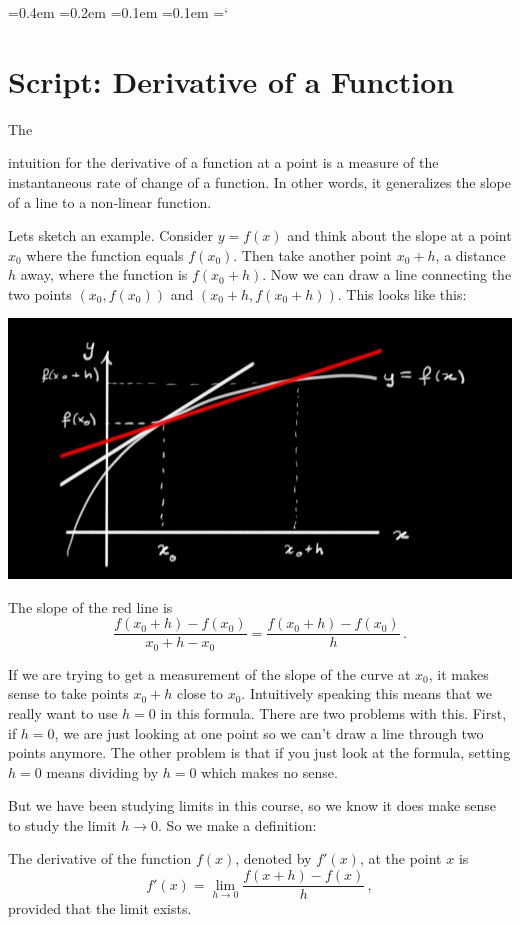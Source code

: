 {\ttfamily
{}\font=0.4em
\font=0.2em
\font=0.1em
\font=0.1em
\hyphenchar\font=`\-



\section*{Script: Derivative of a Function}

\thispagestyle{empty}


\hypertarget{The Derivative}{The} intuition for the derivative of a function at a point is  
a measure of the instantaneous rate of change of a function. In other words, it generalizes
the slope of a line to a non-linear function. 

Lets sketch an example. Consider $y=f(x)$ and think about the slope at a point $x_0$ where the function
equals $f(x_0)$. Then take another point $x_0+h$, a distance $h$ away, where the function is $f(x_0+h)$.
Now we can draw a line connecting the two points $(x_0,f(x_0))$ and $(x_0+h,f(x_0+h))$. This looks like this:

\begin{center}
\includegraphics[scale=.4]{slope_red.jpg}
\end{center} 
 
\noindent 
The slope of the red line is
\[
\frac{f(x_0+h)-f(x_0)}{x_0+h-x_0}=\frac{f(x_0+h)-f(x_0)}{h}\, .
\] 

If we are trying to get a measurement of the slope of the curve at $x_0$, it makes sense to take points $x_0+h$
close to $x_0$. Intuitively speaking this means that we really want to use $h=0$ in this formula. There are two problems 
with this. First, if $h=0$, we are just looking at one point so we can't draw a line through two points anymore. The other problem
is that if you just look at the formula, setting $h=0$ means dividing by $h=0$ which makes no sense.


\newpage
\thispagestyle{empty}

But we have been studying limits in this course, so we know it does make sense to study the limit $h\to 0$. So we make a definition:
}
\begin{definition}
The derivative of the function $f(x)$, denoted by $f'(x)$, at the point $x$ is
\[
f'(x)=\lim_{h\to 0}\frac{f(x+h)-f(x)}{h}\, ,
\]
provided that the limit exists.
\end{definition}



\newpage